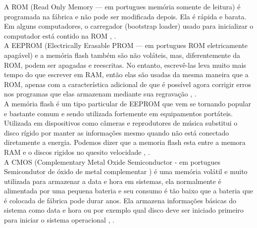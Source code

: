 A ROM (Read Only Memory — em portugues memória somente de leitura) é programada na fábrica e não pode ser modificada depois. Ela é rápida e barata. Em alguns computadores, o carregador (bootstrap loader) usado para inicializar o computador está contido na ROM \cite{Tanenbaum2016}, \cite{Comer2012}.\\
A EEPROM (Electrically Erasable PROM — em portugues ROM eletricamente apagável) e a memória flash também são não voláteis, mas, diferentemente da ROM, podem ser apagadas e reescritas. No entanto, escrevê-las leva muito mais tempo do que escrever em RAM, então elas são usadas da mesma maneira que a ROM, apenas com a característica adicional de que é possível agora corrigir erros nos programas que elas armazenam mediante sua regravação \cite{Tanenbaum2016}, \cite{Comer2012}.\\
A memória flash é um tipo particular de EEPROM que vem se tornando popular e  bastante comum e sendo utilizada fortemente em equipamentos portáteis. Utilizada em dispositivos como câmeras  e reprodutores de música substitui o disco rígido por manter as informações mesmo quando não está conectado diretamente a energia. Podemos dizer que a memoria flash esta entre a memora RAM e o discos rigidos no quesito velocidade \cite{Tanenbaum2016}, \cite{Comer2012}.\\
A CMOS (Complementary Metal Oxide Semiconductor - em portugues 
Semicondutor de óxido de metal complementar
) é uma memória volátil e muito utilizada para armazenar a data e hora em sistemas, ela normalmente é alimentada por uma pequena bateria e seu consumo é tão baixo que a bateria que  é colocada de fábrica pode durar anos. Ela armazena informações básicas do sistema como data e hora ou por exemplo qual disco deve ser iniciado primeiro para iniciar o sistema operacional \cite{Tanenbaum2016}, \cite{Comer2012}.\\
